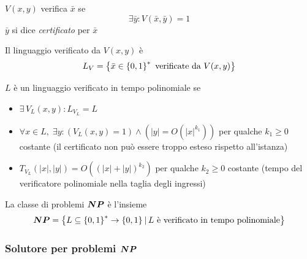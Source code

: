 \begin{definition}
    \label{def:verificatore}
    $V(x,y)$ verifica $\bar{x}$ se 
    \begin{equation*}
        \exists \bar{y} : V( \bar{x}, \bar{y}) = 1
    \end{equation*}
    $\bar{y}$ si dice \emph{certificato} per $\bar{x}$
\end{definition}

\begin{definition}
    \label{def:linguaggioverificato}
    Il linguaggio verificato da $V(x,y)$ è
    \begin{equation*}
        L_V = \left\{ \bar{x} \in \left\{0,1\right\}^{*} \text{ verificate da } V(x,y) \right\}
    \end{equation*}
\end{definition}

\begin{definition}
    \label{def:verificapolinomiale}
    $L$ è un linguaggio verificato in tempo polinomiale se
    \begin{itemize}
        \item $ \exists \, V_L (x,y) : L_{V_{L}} = L$
        \item $ \forall x \in L, \; \exists y :
            \left( 
            V_L(x,y) = 1
            \right)
            \wedge
            \left( 
            |y| = O \left( |x|^{k_{1}} \right)
            \right)
            $ per qualche $k_1 \geq 0$ costante (il certificato non può essere troppo esteso rispetto all'istanza)
        \item $
            T_{V_{L}} (|x|, |y|) = O \left( \left( |x|+|y| \right)^{k_{2}} \right)
            $ per qualche $k_2 \geq 0$ costante (tempo del verificatore polinomiale nella taglia degli ingressi)
    \end{itemize}
\end{definition}

\begin{definition}[Classe NP]
    \label{def:classenp}
    La classe di problemi $\bm{NP}{}$ è l'insieme
    \begin{equation*}
        \bm{NP}{} = \left\{ L \subseteq \left\{0,1\right\}^{*} \to \left\{0,1\right\}^{} |\, L \text{ è verificato in tempo polinomiale}\right\}
    \end{equation*}
\end{definition}

\subsubsection{Solutore per problemi $\bm{NP}$}

